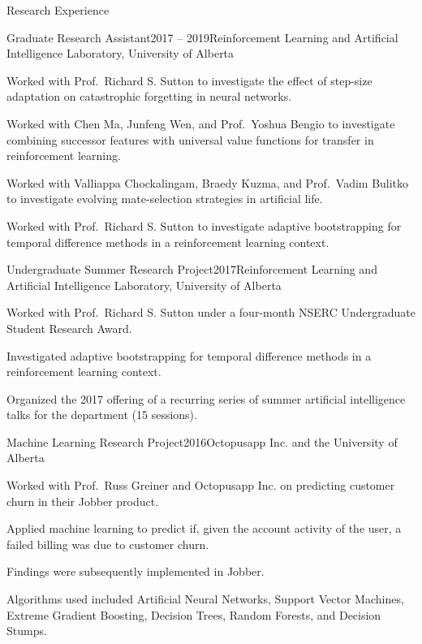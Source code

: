 \documentclass{cv}
\begin{document}
\begin{rSection}{Research Experience}

\begin{rSubsection}{Graduate Research Assistant}{2017 -- 2019}{Reinforcement Learning and Artificial Intelligence Laboratory, University of Alberta}
\item Worked with Prof.~Richard S. Sutton to investigate the effect of step-size adaptation on catastrophic forgetting in neural networks.
\item Worked with Chen Ma, Junfeng Wen, and Prof.~Yoshua Bengio to investigate combining successor features with universal value functions for transfer in reinforcement learning.
\item Worked with Valliappa Chockalingam, Braedy Kuzma, and Prof.~Vadim Bulitko to investigate evolving mate-selection strategies in artificial life.
\item Worked with Prof.~Richard S. Sutton to investigate adaptive bootstrapping for temporal difference methods in a reinforcement learning context.
\end{rSubsection}


\begin{rSubsection}{Undergraduate Summer Research Project}{2017}{Reinforcement Learning and Artificial Intelligence Laboratory, University of Alberta}
\item Worked with Prof.~Richard S. Sutton under a four-month NSERC Undergraduate Student Research Award.
\item Investigated adaptive bootstrapping for temporal difference methods in a reinforcement learning context.
\item Organized the 2017 offering of a recurring series of summer artificial intelligence talks for the department (15 sessions).
\end{rSubsection}


\begin{rSubsection}{Machine Learning Research Project}{2016}{Octopusapp Inc. and the University of Alberta}
\item Worked with Prof.~Russ Greiner and Octopusapp Inc. on predicting customer churn in their Jobber product.
\item Applied machine learning to predict if, given the account activity of the user, a failed billing was due to customer churn.
\item Findings were subsequently implemented in Jobber.
\item Algorithms used included Artificial Neural Networks, Support Vector Machines, Extreme Gradient Boosting, Decision Trees, Random Forests, and Decision Stumps.
\end{rSubsection}


\end{rSection}
\end{document}
